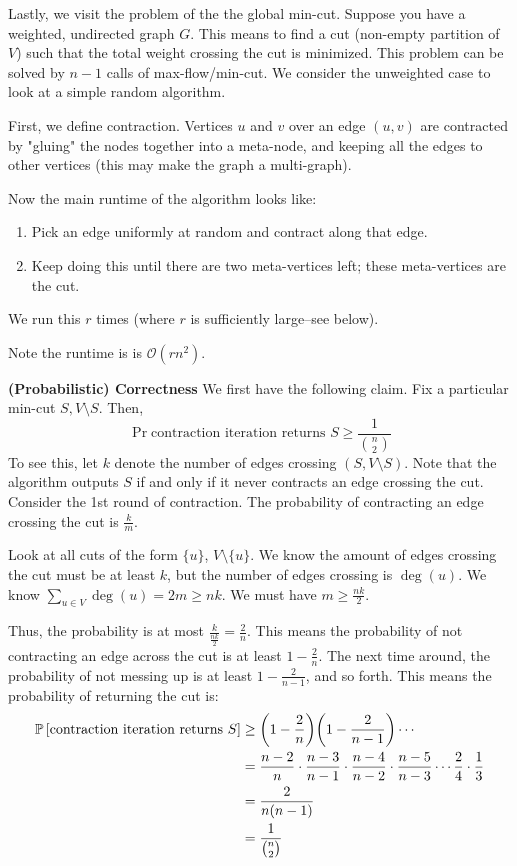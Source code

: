 Lastly, we visit the problem of the the global min-cut. Suppose you have a weighted, undirected graph $G$. This means to find a cut (non-empty partition of $V$) such that the total weight crossing the cut is minimized.
This problem can be solved by $n - 1$ calls of max-flow/min-cut. We consider the unweighted case to look at a simple random algorithm.

\begin{algothm}
    First, we define contraction. Vertices $u$ and $v$ over an edge $(u, v)$ are contracted by "gluing" the nodes together into a meta-node, and keeping all the edges to other vertices (this may make the graph a multi-graph).

    Now the main runtime of the algorithm looks like:
    \begin{enumerate}
        \item Pick an edge uniformly at random and contract along that edge.
        \item Keep doing this until there are two meta-vertices left; these meta-vertices are the cut.
    \end{enumerate}
    We run this $r$ times (where $r$ is sufficiently large--see below).
    
    Note the runtime is is $\mathcal{O}(rn^2)$.

    \textbf{(Probabilistic) Correctness}
    We first have the following claim. Fix a particular min-cut $S, V \setminus S$. Then,
    \[ \Pr{\text{contraction iteration returns $S$}} \geq \frac{1}{\binom{n}{2}} \]
    To see this, let $k$ denote the number of edges crossing $(S, V \setminus S)$. Note that the algorithm outputs $S$ if and only if it never contracts an edge crossing the cut.
    Consider the 1st round of contraction. The probability of contracting an edge crossing the cut is $\frac{k}{m}$. 

    Look at all cuts of the form $\{u\}$, $V \setminus \{u\}$. We know the amount of edges crossing the cut must be at least $k$, but the number of edges crossing is $\deg(u)$.
    We know $\sum_{u \in V} \deg(u) = 2m \geq nk$. We must have $m \geq \frac{nk}{2}$.

    Thus, the probability is at most $\frac{k}{\frac{nk}{2}} = \frac{2}{n}$. This means the probability of not contracting an edge across the cut
    is at least $1 - \frac{2}{n}$. The next time around, the probability of not messing up is at least $1 - \frac{2}{n - 1}$, and so forth. This means the probability of returning the cut is:
    \begin{align*}
        \mathbb{P}\left[ \text{contraction iteration returns $S$} \right] &\geq \qty(1 - \frac{2}{n}) \qty(1 - \frac{2}{n - 1}) \cdots \\
        &= \frac{n - 2}{n} \cdot \frac{n - 3}{n - 1} \cdot \frac{n - 4}{n - 2} \cdot \frac{n - 5}{n - 3} \cdots \frac{2}{4} \cdot \frac{1}{3} \\
        &= \frac{2}{n(n-1)} \\
        &= \frac{1}{\binom{n}{2}}
    \end{align*}


\end{algothm}
